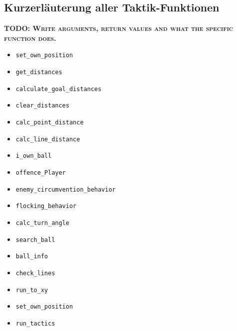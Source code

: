 \subsection*{Kurzerläuterung aller Taktik-Funktionen}
\textbf{\textsc{TODO: Write arguments, return values and what the specific function does.}}
\begin{itemize}
\item \texttt{set\_own\_position}
\item \texttt{get\_distances}
\item \texttt{calculate\_goal\_distances}
\item \texttt{clear\_distances}
\item \texttt{calc\_point\_distance}
\item \texttt{calc\_line\_distance}
\item \texttt{i\_own\_ball}
\item \texttt{offence\_Player}
\item \texttt{enemy\_circumvention\_behavior}
\item \texttt{flocking\_behavior}
\item \texttt{calc\_turn\_angle}
\item \texttt{search\_ball}
\item \texttt{ball\_info}
\item \texttt{check\_lines}
\item \texttt{run\_to\_xy}
\item \texttt{set\_own\_position}
\item \texttt{run\_tactics}




















\end{itemize}



